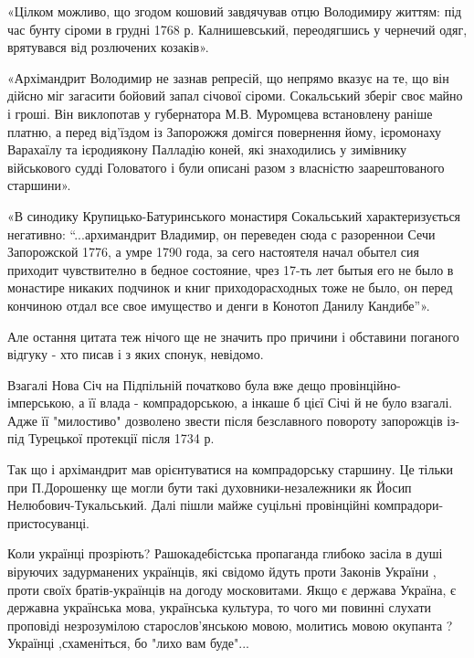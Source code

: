 \begin{itemize}
\begin{itemize}
«Цілком можливо, що згодом кошовий завдячував отцю Володимиру життям: під час
бунту сіроми в грудні 1768 р. Калнишевський, переодягшись у чернечий одяг,
врятувався від розлючених козаків».

«Архімандрит Володимир не зазнав репресій, що непрямо вказує на те, що він
дійсно міг загасити бойовий запал січової сіроми. Сокальський зберіг своє майно
і гроші. Він виклопотав у губернатора М.В. Муромцева встановлену раніше платню,
а перед від’їздом із Запорожжя домігся повернення йому, ієромонаху Варахаїлу та
ієродиякону Палладію коней, які знаходились у зимівнику військового судді
Головатого і були описані разом з власністю заарештованого старшини».

«В синодику Крупицько-Батуринського монастиря Сокальський характеризується
негативно: “...архимандрит Владимир, он переведен сюда с разореннои Сечи
Запорожской 1776, а умре 1790 года, за сего настоятеля начал обытел сия
приходит чувствително в бедное состояние, чрез 17-ть лет бытыя его не было в
монастире никаких подчинок и книг приходорасходных тоже не было, он перед
кончиною отдал все свое имущество и денги в Конотоп Данилу Кандибе”».

Але остання цитата теж нічого ще не значить про причини і обставини поганого
відгуку - хто писав і з яких спонук, невідомо.

Взагалі Нова Січ на Підпільній початково була вже дещо провінційно-імперською,
а її влада - компрадорською, а інкаше б цієї Січі й не було взагалі. Адже її
"милостиво" дозволено звести після безславного повороту запорожців із-під
Турецької протекції після 1734 р.

Так що і архімандрит мав орієнтуватися на компрадорську старшину. Це тільки при
П.Дорошенку ще могли бути такі духовники-незалежники як Йосип
Нелюбович-Тукальський. Далі пішли майже суцільні провінційні
компрадори-пристосуванці.

\end{itemize}

 

Коли українці прозріють? Рашокадебістська пропаганда глибоко засіла в душі
віруючих задурманених українців, які свідомо йдуть проти Законів України ,
проти своїх братів-українців на догоду московитами. Якщо є держава Україна, є
державна українська мова, українська культура, то чого ми повинні слухати
проповіді незрозумілою старослов'янською мовою, молитись мовою окупанта ?
Українці ,схаменіться, бо "лихо вам буде"...


\end{itemize}
